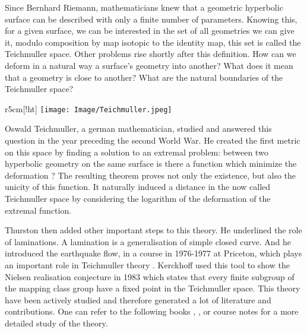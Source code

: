 
\hspace{20 px} Since Bernhard Riemann, mathematicians knew that a geometric hyperbolic surface can be described with only a finite number of parameters. Knowing this, for a given surface, we can be interested in the set of all geometries we can give it, modulo composition by map isotopic to the identity map, this set is called the Teichmuller space. Other problems rise shortly after this definition. How can we deform in a natural way a surface's geometry into another? What does it mean that a geometry is close to another? What are the natural boundaries of the Teichmuller space?

\begin{wrapfigure}{r}{5cm}[!ht]
  \centering
  \texttt{[image: Image/Teichmuller.jpeg]}
  \caption{The mathematician Oswald Teichmuller}
\end{wrapfigure}

\vspace{10 px}

Oswald Teichmuller, a german mathematician, studied and answered this question in the year preceding the second World War. He created the first metric on this space by finding a solution to an extremal problem: between two hyperbolic geometry on the same surface is there a function which minimize the deformation ? The resulting theorem \cite{teichmuller1940extremale} proves not only the existence, but also the unicity of this function. It naturally induced a distance in the now called Teichmuller space by considering the logarithm of the deformation of the extremal function.

\vspace{10 px}

Thurston then added other important steps to this theory. He underlined the role of laminations. A lamination is a generalisation of simple closed curve. And he introduced the earthquake flow, in a course in 1976-1977 at Priceton, which plays an important role in Teichmuller theory .
Kerckhoff used this tool to show the Nielsen realisation conjecture in 1983 \cite{NielsenRealizationPro} which states that every finite subgroup of the mapping class group have a fixed point in the Teichmuller space.
This theory have been actively studied and therefore generated a lot of literature and contributions. One can refer to the following books \cite{farb2011primer}, \cite{hubbardhal01297628}, \cite{kapovich2009hyperbolic} or course notes \cite{Mcmullen1998HyperbolicM} \cite{Mcmullen1998Riemann} for a more detailed study of the theory.

